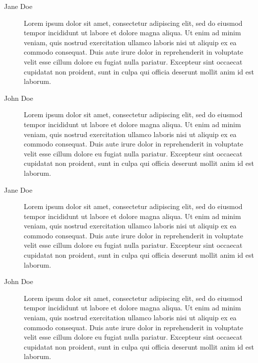 \begin{description}
	\item[Jane Doe] Lorem ipsum dolor sit amet, consectetur adipiscing elit, sed do eiusmod tempor incididunt ut labore et dolore magna aliqua. Ut enim ad minim veniam, quis nostrud exercitation ullamco laboris nisi ut aliquip ex ea commodo consequat. Duis aute irure dolor in reprehenderit in voluptate velit esse cillum dolore eu fugiat nulla pariatur. Excepteur sint occaecat cupidatat non proident, sunt in culpa qui officia deserunt mollit anim id est laborum.
	\item[John Doe] Lorem ipsum dolor sit amet, consectetur adipiscing elit, sed do eiusmod tempor incididunt ut labore et dolore magna aliqua. Ut enim ad minim veniam, quis nostrud exercitation ullamco laboris nisi ut aliquip ex ea commodo consequat. Duis aute irure dolor in reprehenderit in voluptate velit esse cillum dolore eu fugiat nulla pariatur. Excepteur sint occaecat cupidatat non proident, sunt in culpa qui officia deserunt mollit anim id est laborum.
	\item[Jane Doe] Lorem ipsum dolor sit amet, consectetur adipiscing elit, sed do eiusmod tempor incididunt ut labore et dolore magna aliqua. Ut enim ad minim veniam, quis nostrud exercitation ullamco laboris nisi ut aliquip ex ea commodo consequat. Duis aute irure dolor in reprehenderit in voluptate velit esse cillum dolore eu fugiat nulla pariatur. Excepteur sint occaecat cupidatat non proident, sunt in culpa qui officia deserunt mollit anim id est laborum.
	\item[John Doe] Lorem ipsum dolor sit amet, consectetur adipiscing elit, sed do eiusmod tempor incididunt ut labore et dolore magna aliqua. Ut enim ad minim veniam, quis nostrud exercitation ullamco laboris nisi ut aliquip ex ea commodo consequat. Duis aute irure dolor in reprehenderit in voluptate velit esse cillum dolore eu fugiat nulla pariatur. Excepteur sint occaecat cupidatat non proident, sunt in culpa qui officia deserunt mollit anim id est laborum.

\end{description}
